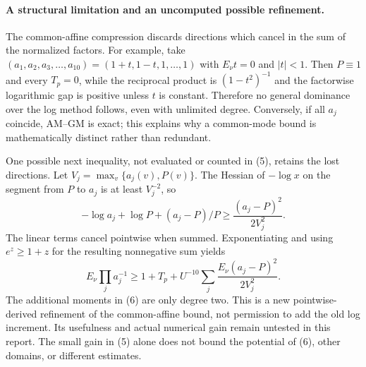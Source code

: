 \paragraph{A structural limitation and an uncomputed possible refinement.}
The common-affine compression discards directions which cancel in the
sum of the normalized factors. For example, take
$(a_1,a_2,a_3,\ldots,a_{10})=(1+t,1-t,1,\ldots,1)$ with
$E_\nu t=0$ and $|t|<1$. Then $P\equiv1$ and every $T_p=0$, while
the reciprocal product is $(1-t^2)^{-1}$ and the factorwise logarithmic
gap is positive unless $t$ is constant. Therefore no general dominance
over the log method follows, even with unlimited degree. Conversely,
if all $a_j$ coincide, AM--GM is exact; this explains why a common-mode
bound is mathematically distinct rather than redundant.

One possible next inequality, not evaluated or counted in (5), retains
the lost directions. Let
$V_j=\max_{v}\{a_j(v),P(v)\}$. The Hessian of $-\log x$ on the segment
from $P$ to $a_j$ is at least $V_j^{-2}$, so
\[
 -\log a_j+\log P+(a_j-P)/P
 \ge\frac{(a_j-P)^2}{2V_j^2}.
\]
The linear terms cancel pointwise when summed. Exponentiating and using
$e^z\ge1+z$ for the resulting nonnegative sum yields
\[
 E_\nu\prod_j a_j^{-1}
 \ge 1+T_p+
 U^{-10}\sum_j\frac{E_\nu(a_j-P)^2}{2V_j^2}.
 \tag{6}
\]
The additional moments in (6) are only degree two. This is a new
pointwise-derived refinement of the common-affine bound, not permission
to add the old log increment. Its usefulness and actual numerical
gain remain untested in this report. The small gain in (5) alone does
not bound the potential of (6), other domains, or different estimates.
